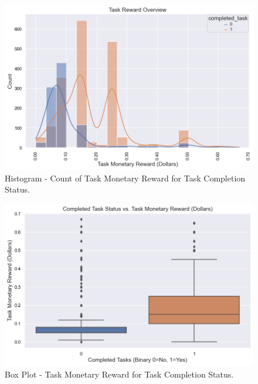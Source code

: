 \documentclass[11pt]{article}
\begin{document}
\begin{figure}[hbt!]
  \centering
  \includegraphics[width=420pt]{figures/task-monetary_reward_in_dollars-vs-completed_task-histogram}
  \caption{Histogram - Count of Task Monetary Reward for Task Completion Status.}
\end{figure}

\begin{figure}[hbt!]
  \centering
  \includegraphics[width=420pt]{figures/completed_task-vs-task-monetary_reward_in_dollars-boxplot}
  \caption{Box Plot - Task Monetary Reward for Task Completion Status.}
\end{figure}

\clearpage
\end{document}

